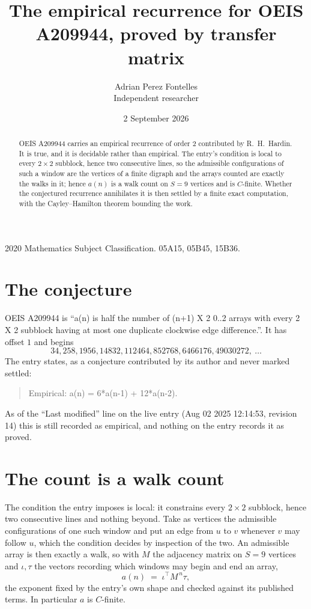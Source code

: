 \documentclass[11pt,a4paper]{article}
\title{The empirical recurrence for OEIS A209944, proved by transfer matrix}
\author{Adrian Perez Fontelles\\ \small Independent researcher}
\date{2 September 2026}
\theoremstyle{plain}
\theoremstyle{definition}
\begin{document}
\maketitle

\begin{abstract}
OEIS A209944 carries an empirical recurrence of order $2$ contributed by R.~H.~Hardin. It is
true, and it is decidable rather than empirical. The entry's condition is local to every $2\times2$ subblock, hence two consecutive lines, so
the admissible configurations of such a window are the vertices of a finite digraph and the
arrays counted are exactly the walks in it; hence $a(n)$ is a walk count on $S=9$ vertices
and is $C$-finite. Whether the conjectured recurrence annihilates it is then settled by a
finite exact computation, with the Cayley--Hamilton theorem bounding the work.
\end{abstract}

\noindent\small 2020 Mathematics Subject Classification. 05A15, 05B45, 15B36.\normalsize

\section{The conjecture}

OEIS A209944 is ``a(n) is half the number of (n+1) X 2 0..2 arrays with every 2 X 2 subblock having at most one duplicate clockwise edge difference.''. It has offset $1$ and begins
\[
34, 258, 1956, 14832, 112464, 852768, 6466176, 49030272,\ \dots
\]
The entry states, as a conjecture contributed by its author and never marked settled:
\begin{quote}
Empirical: a(n) = 6*a(n-1) + 12*a(n-2).
\end{quote}
As of the ``Last modified'' line on the live entry (Aug 02 2025 12:14:53, revision 14) this is still
recorded as empirical, and nothing on the entry records it as proved.

\section{The count is a walk count}

The condition the entry imposes is local: it constrains every $2\times2$ subblock, hence two consecutive lines and nothing beyond. Take as
vertices the admissible configurations of one such window and put an edge from $u$ to $v$
whenever $v$ may follow $u$, which the condition decides by inspection of the two. An
admissible array is then exactly a walk, so with $M$ the adjacency matrix on $S=9$ vertices
and $\iota,\tau$ the vectors recording which windows may begin and end an array,
\[
a(n)\;=\;\iota^{\!\top}M^{\,n}\tau ,
\]
the exponent fixed by the entry's own shape and checked against its published terms. In
particular $a$ is $C$-finite.
\end{document}
